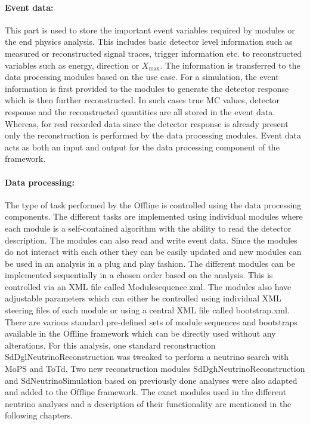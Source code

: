 \paragraph*{Event data:}
This part is used to store the important event variables required by modules or the end physics analysis. This includes basic detector level information such as measured or reconstructed signal traces, trigger information etc. to reconstructed variables such as energy, direction or $X_{\text{max}}$. The information is transferred to the data processing modules based on the use case. For a simulation, the event information is first provided to the modules to generate the detector response which is then further reconstructed. In such cases true MC values, detector response and the reconstructed quantities are all stored in the event data. Whereas, for real recorded data since the detector response is already present only the reconstruction is performed by the data processing modules. Event data acts as both an input and output for the data processing component of the framework.

\paragraph*{Data processing:}
The type of task performed by the $\mathrm{\overline{Off}\underline{line}}$ is controlled using the data processing components. The different tasks are implemented using individual modules where each module is a self-contained algorithm with the ability to read the detector description. The modules can also read and write event data. Since the modules do not interact with each other they can be easily updated and new modules can be used in an analysis in a plug and play fashion. The different modules can be implemented sequentially in a chosen order based on the analysis. This is controlled via an XML file called Modulesequence.xml. The modules also have adjustable parameters which can either be controlled using individual XML steering files of each module or using a central XML file called bootstrap.xml. There are various standard pre-defined sets of module sequences and bootstraps available in the $\mathrm{\overline{Off}\underline{line}}$ framework which can be directly used without any alterations. For this analysis, one standard reconstruction SdDglNeutrinoReconstruction was tweaked to perform a neutrino search with MoPS and ToTd. Two new reconstruction modules SdDghNeutrinoReconstruction and SdNeutrinoSimulation based on previously done analyses were also adapted and added to the $\mathrm{\overline{Off}\underline{line}}$ framework. The exact modules used in the different neutrino analyses and a description of their functionality are mentioned in the following chapters.

